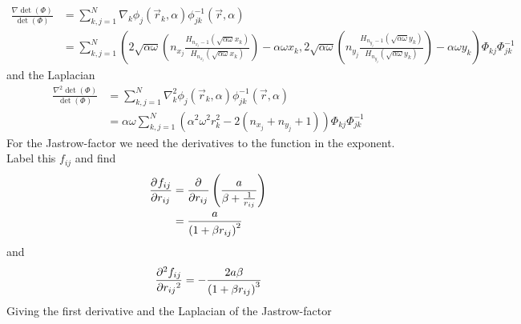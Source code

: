 \documentclass[a4paper, hidelinks, 10pt]{article}\usepackage[utf8]{inputenc}
\newcommand{\suml}[2]{\sum\limits_{#1=1}^{#2}}
\begin{document}
        \begin{equation}
            \begin{aligned}
                \frac{\nabla\det(\Phi)}{\det(\Phi)} &= \suml{k,j}{N} \nabla_k
                \phi_j\left(\vec{r}_k,\alpha\right)
                \phi^{-1}_{jk}\left(\vec{r},\alpha\right) \\
                &= \suml{k,j}{N} \left(2\sqrt{\alpha\omega}
                \left(n_{x_j}\frac{H_{n_{x_j}-1}
                \left(\sqrt{\alpha\omega}x_k\right)}
                {H_{n_{x_j}}\left(\sqrt{\alpha\omega}x_k\right)}\right) -
                \alpha\omega x_k, 2\sqrt{\alpha\omega}
                \left(n_{y_j}\frac{H_{n_{y_j}-1}
                \left(\sqrt{\alpha\omega}y_k\right)}
                {H_{n_{y_j}}\left(\sqrt{\alpha\omega}y_k\right)}\right) -
                \alpha\omega y_k\right) \Phi_{kj}\Phi^{-1}_{jk}
            \end{aligned}
            \label{eq:detderfirrat}
        \end{equation}
    and the Laplacian
        \begin{equation}
            \begin{aligned}
                \frac{\nabla^2\det(\Phi)}{\det(\Phi)} &= \suml{k,j}{N} \nabla^2_k
                \phi_j\left(\vec{r}_k,\alpha\right)
                \phi^{-1}_{jk}\left(\vec{r},\alpha\right) \\
                &= \alpha\omega\suml{k,j}{N} \left(\alpha^2\omega^2r^2_k -
                2\left(n_{x_j} + n_{y_j} + 1\right)\right) \Phi_{kj}\Phi^{-1}_{jk}
            \end{aligned}
            \label{eq:detdersecrat}
        \end{equation}
    For the Jastrow-factor we need the derivatives to the function in the
    exponent. Label this $f_{ij}$ and find
        \begin{align}
            \prd{r_{ij}}[f_{ij}] &= \prd{r_{ij}}\left(\frac{a}{\beta +
            \frac{1}{r_{ij}}}\right) \nonumber \\
            &= \frac{a}{\left(1+\beta r_{ij}\right)^2}
            \label{eq:gfijder1}
        \end{align}
    and
        \begin{equation}
            \prd{r_{ij}}[f_{ij}][2] = -\frac{2a\beta}{\left(1+\beta
            r_{ij}\right)^3}
            \label{eq:gfijder2}
        \end{equation}
    Giving the first derivative and the Laplacian of the Jastrow-factor
\end{document}

